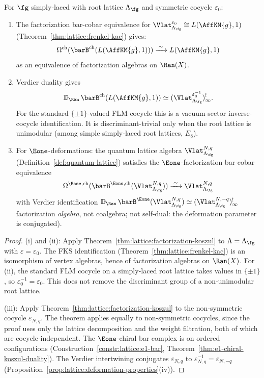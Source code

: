 \begin{corollary}
\label{cor:lattice:factorization-dk-level1}
For $\fg$ simply-laced with root lattice $\Lambda_\fg$ and
symmetric cocycle $\varepsilon_0$:
\begin{enumerate}[label=(\roman*)]
\item The factorization bar-cobar equivalence for
 $\Vlat_{\Lambda_\fg}^{\varepsilon_0}
 \cong L(\AffKM{g}, 1)$
 \textup{(}Theorem~\textup{\ref{thm:lattice:frenkel-kac})} gives:
 \[
 \Omega^{\mathrm{ch}}(\barB^{\mathrm{ch}}(L(\AffKM{g}, 1)))
 \xrightarrow{\;\sim\;}
 L(\AffKM{g}, 1)
 \]
 as an equivalence of factorization algebras on $\Ran(X)$.

\item Verdier duality gives
 \[
 \mathbb{D}_{\Ran}\, \barB^{\mathrm{ch}}(L(\AffKM{g}, 1))
 \simeq
 (\Vlat_{\Lambda_\fg}^{\varepsilon_0^{-1}})^!_\infty .
 \]
 For the standard $\{\pm1\}$-valued FLM cocycle this is a
 vacuum-sector inverse-cocycle identification. It is
 discriminant-trivial only when the root lattice is unimodular
 \textup{(}among simple simply-laced root lattices, $E_8$\textup{)}.

\item For $\Eone$-deformations: the quantum lattice algebra
 $\Vlat_{\Lambda_\fg}^{N,q}$
 \textup{(}Definition~\textup{\ref{def:quantum-lattice})} satisfies
 the $\Eone$-factorization bar-cobar equivalence
 \[
 \Omega^{\Eone,\mathrm{ch}}(
 \barB^{\Eone,\mathrm{ch}}(\Vlat_{\Lambda_\fg}^{N,q}))
 \xrightarrow{\;\sim\;}
 \Vlat_{\Lambda_\fg}^{N,q}
 \]
 with Verdier identification
 $\mathbb{D}_{\Ran}\, \barB^{\Eone}(\Vlat_{\Lambda_\fg}^{N,q})
 \simeq (\Vlat_{\Lambda_\fg}^{N,-q})^!_\infty$
 factorization \emph{algebra}, not coalgebra;
 not self-dual: the deformation parameter is
 conjugated\textup{)}.
\end{enumerate}
\end{corollary}

\begin{proof}
(i) and (ii): Apply Theorem~\ref{thm:lattice:factorization-koszul}
to $\Lambda = \Lambda_\fg$ with $\varepsilon = \varepsilon_0$. The
FKS identification
(Theorem~\ref{thm:lattice:frenkel-kac}) is an isomorphism of vertex
algebras, hence of factorization algebras on $\Ran(X)$. For (ii), the
standard FLM cocycle on a simply-laced root lattice takes values in
$\{\pm1\}$, so $\varepsilon_0^{-1}=\varepsilon_0$. This does not
remove the discriminant group of a non-unimodular root lattice.

(iii): Apply Theorem~\ref{thm:lattice:factorization-koszul} to the
non-symmetric cocycle $\varepsilon_{N,q}$. The theorem applies
equally to non-symmetric cocycles, since the proof uses only the
lattice decomposition and the weight filtration, both of which are
cocycle-independent. The $\Eone$-chiral bar complex is on ordered
configurations
(Construction~\ref{constr:lattice:e1-bar},
Theorem~\ref{thm:e1-chiral-koszul-duality}). The Verdier
intertwining conjugates $\varepsilon_{N,q}$ to
$\varepsilon_{N,q}^{-1} = \varepsilon_{N,-q}$
(Proposition~\ref{prop:lattice:deformation-properties}(iv)).
\end{proof}

